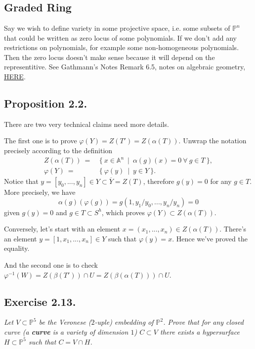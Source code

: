 \chapter{}
\section{Graded Ring}

Say we wish to define variety in some projective space, i.e. some subsets of $\mathbb P^n$ that could be written as zero locus of some polynomials.
If we don't add any restrictions on polynomials, for example some non-homogeneous polynomials. 
Then the zero locus doesn't make sense because it will depend on the representitive. See Gathmann's Notes Remark 6.5, notes on algebraic geometry, \href{https://agag-gathmann.math.rptu.de/class/alggeom-2021/alggeom-2021-c6.pdf}{HERE}.

\section{Proposition 2.2.}

There are two very technical claims need more details. 

The first one is to prove $\varphi(Y)=Z(T')=Z(\alpha (T)).$
Unwrap the notation precisely according to the definition \begin{align*}
    Z(\alpha (T)) ~=&~ \{~ x\in \mathbb A^n ~\mid~ \alpha(g)(x)=0 ~\forall~ g\in T ~\},\\
    \varphi(Y) ~=&~ \{~ \varphi(y) ~\mid~ y\in Y ~\}.
\end{align*}
Notice that $y=[y_0,...,y_n]\in Y\subset \overline{Y}=Z(T)$, therefore $g(y)=0$ for any $g\in T$.
More precisely, we have 
\[\alpha(g)(\varphi(g))=g(1,y_1/y_0,...,y_n/y_n)=0\] given $g(y)=0$ and $g\in T\subset S^h$, which proves $\varphi(Y)\subset Z(\alpha (T))$.

Conversely, let's start with an element $x=(x_1,...,x_n)\in Z(\alpha (T))$. There's an element $y=[1,x_1,...,x_n]\in Y$ such that $\varphi(y)=x$. Hence we've proved the equality.

And the second one is to check $\varphi^{-1}(W)=Z(\beta(T'))\cap U=Z(\beta(\alpha(T)))\cap U$.


\section{Exercise 2.13.}
\textit{Let $V\subset \mathbb P^5$ be the Veronese ($2$-uple) embedding of $\mathbb P^2$. Prove that for any closed curve (a \textbf{curve} is a variety of dimension $1$) $C\subset V$ there exists a hypersurface $H\subset \mathbb P^5$ such that $C=V\cap H$.}

